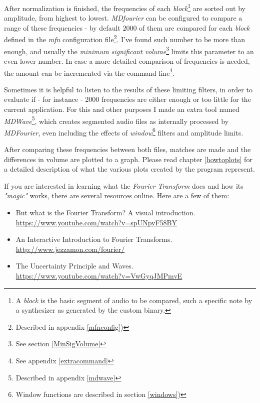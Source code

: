 \documentclass[10pt,a4paper]{report}
\begin{document}
After normalization is finished, the frequencies of each \textit{block}\footnote{A \textit{block} is the basic segment of audio to be compared, such a specific note by a synthesizer as generated by the custom binary.} are sorted out by amplitude, from highest to lowest. \textit{MDfourier} can be configured to compare a range of these frequencies - by default $2000$ of them are compared for each \textit{block} defined in the \textit{mfn} configuration file\footnote{Described in appendix \ref{mfnconfig})}. I've found such number to be more than enough, and usually the \textit{minimum significant volume}\footnote{See section \ref{MinSigVolume}} limits this parameter to an even lower number. In case a more detailed comparison of frequencies is needed, the amount can be incremented via the command line\footnote{See appendix \ref{extracommand}}.

Sometimes it is helpful to listen to the results of these limiting filters, in order to evaluate if - for instance - 2000 frequencies are either enough or too little for the current application. For this and other purposes I made an extra tool named \textit{MDWave}\footnote{Described in appendix \ref{mdwave}}, which creates segmented audio files as internally processed by \textit{MDFourier}, even including the effects of \textit{window}\footnote{Window functions are described in section \ref{windows})} filters and amplitude limits.

After comparing these frequencies between both files, matches are made and the differences in volume are plotted to a graph. Please read chapter \ref{howtoplots} for a detailed description of what the various plots created by the program represent.

If you are interested in learning what the \textit{Fourier Transform} does and how its \textit{"magic"} works, there are several resources online. Here are a few of them:

\begin{itemize}
	\item But what is the Fourier Transform? A visual introduction.\\ \url{https://www.youtube.com/watch?v=spUNpyF58BY}
	\item An Interactive Introduction to Fourier Transforms.\\ \url{http://www.jezzamon.com/fourier/}
	\item The Uncertainty Principle and Waves.\\
	\url{https://www.youtube.com/watch?v=VwGyqJMPmvE}
\end{itemize}
\end{document}
